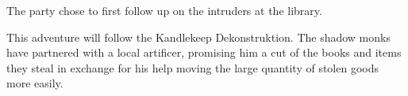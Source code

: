 The party chose to first follow up on the intruders at the library.

This adventure will follow the Kandlekeep Dekonstruktion.
The shadow monks have partnered with a local artificer, promising him a cut of the books and items they steal in exchange for his help moving the large quantity of stolen goods more easily.
